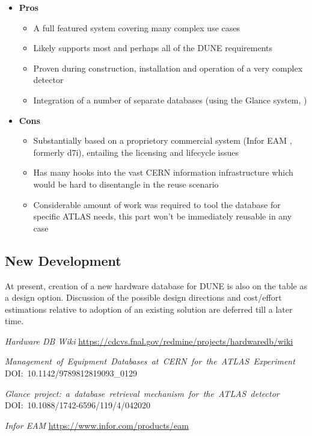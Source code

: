 \documentclass[pdftex,12pt,letter]{article}
\begin{document}
\begin{itemize}

\item  \textbf{Pros}
\begin{itemize}
\item A full featured system covering many complex use cases
\item Likely supports most and perhaps all of the DUNE requirements
\item Proven during construction, installation and operation of a very complex detector
\item Integration of a number of separate databases (using the Glance system, \cite{glance})
\end{itemize}

\item \textbf{Cons}
\begin{itemize}
\item Substantially based on a proprietory commercial system (Infor EAM \cite{infor}, formerly d7i), entailing the licensing and lifecycle issues
\item Has many hooks into the vast CERN information infrastructure which would be hard to disentangle in the reuse scenario
\item Considerable amount of work was required to tool the database for specific ATLAS needs, this part won't be immediately reusable in any case
\end{itemize}

\end{itemize}

\subsection{New Development}
At present, creation of a new hardware database for DUNE is also on the table as a design option. Discussion
of the possible design directions and cost/effort estimations relative to adoption of an existing solution
are deferred till a later time.




\begin{thebibliography}{1}

{\textit{Hardware DB Wiki} \url{https://cdcvs.fnal.gov/redmine/projects/hardwaredb/wiki}}

{\textit{\mbox{Management of Equipment Databases at CERN for the ATLAS Experiment}}
\mbox{DOI: 10.1142/9789812819093\_0129}
}

{\textit{\mbox{Glance project: a database retrieval mechanism for the ATLAS detector}}
\mbox{DOI: 10.1088/1742-6596/119/4/042020}
}

{\textit{Infor EAM} \url{https://www.infor.com/products/eam}}

\end{thebibliography}
\end{document}

